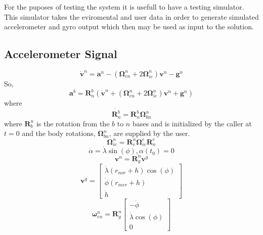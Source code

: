 \documentclass[a4paper]{report}
\numberwithin{equation}{chapter}
\newcommand{\mat}[1]{\boldsymbol{#1}}
\begin{document}
For the puposes of testing the system it is usefull to have a testing simulator. This simulator takes the eviromental and user data in order to generate simulated accelerometer and gyro output which then may be used as input to the solution.

\subsection[Accelerometer Signal]{Accelerometer Signal}

\begin{equation}
\dot{\mat{v}}^n = \mat{a}^n - \left( \mat{\Omega}^n_{en} + 2 \mat{\Omega}^n_{ie} \right) \mat{v}^n - \mat{g}^n
\end{equation}
So,
\begin{equation}
\mat{a}^b = \mat{R}^b_n \left( \dot{\mat{v}}^n + \left( \mat{\Omega}^n_{en} + 2 \mat{\Omega}^n_{ie} \right) \mat{v}^n + \mat{g}^n \right)
\end{equation}
where
\begin{equation}
\dot{\mat{R}^b_n} = \mat{R}^b_n  \mat{\Omega}^n_{bn}
\end{equation}
where $\mat{R}^n_b$ is the rotation from the $b$ to $n$ bases and is initialized by the caller at $t = 0$ and the body rotations, $\mat{\Omega}^n_{bn}$, are supplied by the user.
\begin{equation}
\mat{\Omega}^n_{ie} = \mat{R}^n_e \mat{\Omega}^e_{ie} \mat{R}^e_n
\end{equation}
\begin{equation}
\dot{\alpha} = \dot{\lambda} \sin \left( \phi \right), \alpha \left( t_0 \right) = 0
\end{equation}
\begin{equation}
\mat{v}^n = \mat{R}^n_g \mat{v}^g
\end{equation}
\begin{equation}
\mat{v}^g =
\begin{bmatrix}
\dot{\lambda} \left( r_{nor} + h \right) \cos \left( \phi \right) \\
\dot{\phi} \left( r_{mer} + h \right) \\
\dot{h}
\end{bmatrix}
\end{equation}
\begin{equation}
\mat{\omega}^n_{en} = \mat{R}^n_g
\begin{bmatrix}
-\dot{\phi} \\
\dot{\lambda} \cos \left( \phi \right) \\
0
\end{bmatrix}
\end{equation}
\end{document}
